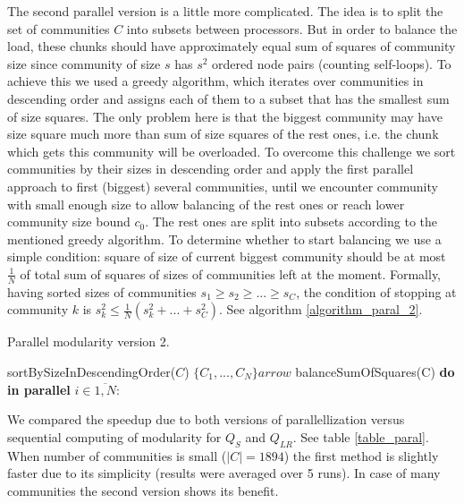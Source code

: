 \documentclass[a4paper,twocolumn]{article}
\begin{document}
The second parallel version is a little more complicated. The idea is to split the set of communities $C$ into subsets between processors. But in order to balance the load, these chunks should have approximately equal sum of squares of community size since community of size $s$ has $s^2$ ordered node pairs (counting self-loops). To achieve this we used a greedy algorithm, which iterates over communities in descending order and assigns each of them to a subset that has the smallest sum of size squares. The only problem here is that the biggest community may have size square much more than sum of size squares of the rest ones, i.e. the chunk which gets this community will be overloaded. To overcome this challenge we sort communities by their sizes in descending order and apply the first parallel approach to first (biggest) several communities, until we encounter community with small enough size to allow balancing of the rest ones or reach lower community size bound $c_0$. The rest ones are split into subsets according to the mentioned greedy algorithm. To determine whether to start balancing we use a simple condition: square of size of current biggest community should be at most $\frac{1}{N}$ of total sum of squares of sizes of communities left at the moment. Formally, having sorted sizes of communities $s_1 \geqslant s_2 \geqslant ... \geqslant s_{C}$, the condition of stopping at community $k$ is $s_k^2 \leqslant \frac{1}{N} (s_k^2 + ... + s_C^2)$. See algorithm \ref{algorithm_paral_2}.

\begin{algorithm}[h!]
\caption{Parallel modularity version 2.}
\label{algorithm_paral_2}

sortBySizeInDescendingOrder($C$)
\BlankLine
{}
\BlankLine
$\{ C_1, ... , C_N \} arrow$ balanceSumOfSquares(C)
\BlankLine
\textbf{do in parallel} $i \in \overline{1,N}$:
{
}
\BlankLine

\end{algorithm}

We compared the speedup due to both versions of parallellization versus sequential computing of modularity for $Q_S$ and $Q_{LR}$. See table \ref{table_paral}. When number of communities is small ($|C|=1894$) the first method is slightly faster due to its simplicity (results were averaged over 5 runs). In case of many communities the second version shows its benefit.
\end{document}
